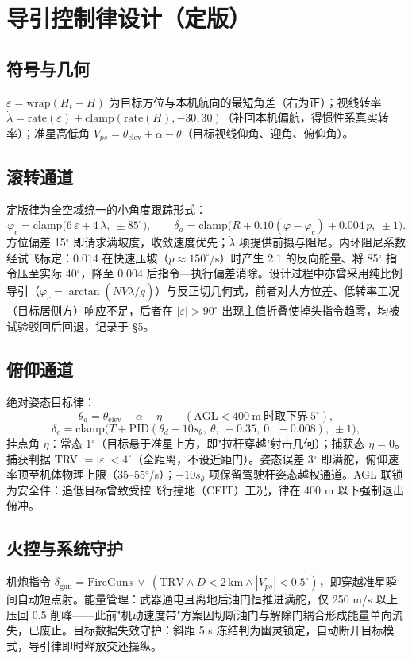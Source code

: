 \documentclass[12pt,UTF8,a4paper]{ctexart}
\begin{document}
\section{导引控制律设计（定版）}
\subsection{符号与几何}
$\varepsilon=\mathrm{wrap}(H_t-H)$ 为目标方位与本机航向的最短角差（右为正）；视线转率 $\dot\lambda=\mathrm{rate}(\varepsilon)+\mathrm{clamp}(\mathrm{rate}(H),-30,30)$（补回本机偏航，得惯性系真实转率）；准星高低角 $V_{\!ps}=\theta_{\mathrm{elev}}+\alpha-\theta$（目标视线仰角、迎角、俯仰角）。

\subsection{滚转通道}
定版律为全空域统一的小角度跟踪形式：
\[
\varphi_c=\mathrm{clamp}\!\bigl(6\,\varepsilon+4\,\dot\lambda,\ \pm85^\circ\bigr),
\qquad
\delta_a=\mathrm{clamp}\!\bigl(R+0.10(\varphi-\varphi_c)+0.004\,p,\ \pm1\bigr).
\]
方位偏差 15$^\circ$ 即请求满坡度，收敛速度优先；$\dot\lambda$ 项提供前摄与阻尼。内环阻尼系数经试飞标定：0.014 在快速压坡（$p\approx150^\circ$/s）时产生 2.1 的反向舵量、将 85$^\circ$ 指令压至实际 40$^\circ$，降至 0.004 后指令—执行偏差消除。设计过程中亦曾采用纯比例导引（$\varphi_c=\arctan(NV\dot\lambda/g)$）与反正切几何式，前者对大方位差、低转率工况（目标居侧方）响应不足，后者在 $|\varepsilon|>90^\circ$ 出现主值折叠使掉头指令趋零，均被试验驳回后回退，记录于 \S5。

\subsection{俯仰通道}
绝对姿态目标律：
\[
\theta_d=\theta_{\mathrm{elev}}+\alpha-\eta\qquad(\text{AGL}<400\ \mathrm{m}\ \text{时取下界}\ 5^\circ),
\]
\[
\delta_e=\mathrm{clamp}\!\bigl(T+\mathrm{PID}(\theta_d-10s_\theta,\ \theta,\ -0.35,\ 0,\ -0.008),\ \pm1\bigr),
\]
挂点角 $\eta$：常态 1$^\circ$（目标悬于准星上方，即"拉杆穿越"射击几何）；捕获态 $\eta=0$。捕获判据 TRV $=|\varepsilon|<4^\circ$（全距离，不设近距门）。姿态误差 3$^\circ$ 即满舵，俯仰速率顶至机体物理上限（35--55$^\circ$/s）；$-10s_\theta$ 项保留驾驶杆姿态越权通道。AGL 联锁为安全件：追低目标曾致受控飞行撞地（CFIT）工况，律在 400 m 以下强制退出俯冲。

\subsection{火控与系统守护}
机炮指令 $\delta_{\mathrm{gun}}=\mathrm{FireGuns}\ \lor\ (\mathrm{TRV}\land D<2\,\mathrm{km}\land|V_{\!ps}|<0.5^\circ)$，即穿越准星瞬间自动短点射。能量管理：武器通电且离地后油门恒推进满舵，仅 250 m/s 以上压回 0.5 削峰——此前"机动速度带"方案因切断油门与解除门耦合形成能量单向流失，已废止。目标数据失效守护：斜距 5 s 冻结判为幽灵锁定，自动断开目标模式，导引律即时释放交还操纵。
\end{document}
